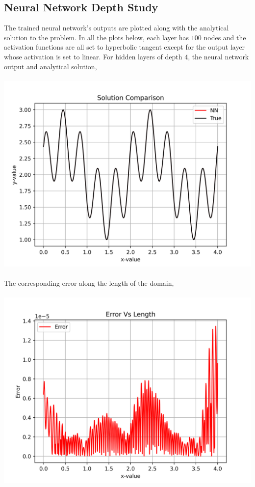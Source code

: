 \documentclass[a4paper, 12pt]{report}
\def\size{0.92}
\begin{document}
\begin{center}
\section{Neural Network Depth Study}

The trained neural network's outputs are plotted along with the analytical solution to the problem. In all the plots below, each layer has $100$ nodes and the activation functions are all set to hyperbolic tangent except for the output layer whose activation is set to linear. For hidden layers of depth $4$, the neural network output and analytical solution,
\\~\\\includegraphics[scale=\size]{depthsol4.png}
\\~\\The corresponding error along the length of the domain,
\\~\\\includegraphics[scale=\size]{deptherr4.png}

\end{center}
\end{document}
